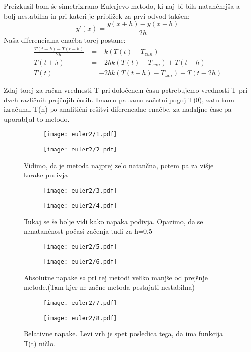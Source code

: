 \documentclass{article}
\begin{document}
Preizkusil bom še simetrizirano Eulerjevo metodo, ki naj bi bila natančnejša a bolj nestabilna in pri kateri je približek za prvi odvod takšen:
\begin{equation*}
y'(x) = \frac{y(x+h) - y(x-h)}{2h}
\end{equation*}
Naša diferencialna enačba torej postane:
\begin{align*}
\frac{T(t+h)-T(t-h)}{2h} &= -k(T(t) - T_{zun}) \\
T(t+h) &= -2hk(T(t) - T_{zun}) + T(t-h) \\
T(t) &= -2hk(T(t-h) - T_{zun}) + T(t-2h)  
\end{align*}

Zdaj torej za račun vrednosti T pri določenem času potrebujemo vrednosti T pri dveh različnih prejšnjih časih. Imamo pa samo začetni pogoj T(0), zato bom izračunal T(h) po analitični rešitvi diferencalne enačbe, za nadaljne čase pa uporabljal to metodo.

\begin{figure}[H]
\begin{subfigure}{.5\textwidth}
\texttt{[image: euler2/1.pdf]}
\end{subfigure}
\begin{subfigure}{.5\textwidth}
\texttt{[image: euler2/2.pdf]}
\end{subfigure}
\caption*{Vidimo, da je metoda najprej zelo natančna, potem pa za višje korake podivja}
\end{figure}
\begin{figure}[H]
\begin{subfigure}{.5\textwidth}
\texttt{[image: euler2/3.pdf]}
\end{subfigure}
\begin{subfigure}{.5\textwidth}
\texttt{[image: euler2/4.pdf]}
\end{subfigure}
\caption*{Tukaj se še bolje vidi kako napaka podivja. Opazimo, da se nenatančnost počasi začenja tudi za h=0.5}
\end{figure}
\begin{figure}[H]
\begin{subfigure}{.5\textwidth}
\texttt{[image: euler2/5.pdf]}
\end{subfigure}
\begin{subfigure}{.5\textwidth}
\texttt{[image: euler2/6.pdf]}
\end{subfigure}
\caption*{Absolutne napake so pri tej metodi veliko manjše od prejšnje metode.(Tam kjer ne začne metoda postajati nestabilna)}
\end{figure}
\begin{figure}[H]
\begin{subfigure}{.5\textwidth}
\texttt{[image: euler2/7.pdf]}
\end{subfigure}
\begin{subfigure}{.5\textwidth}
\texttt{[image: euler2/8.pdf]}
\end{subfigure}
\caption*{Relativne napake. Levi vrh je spet posledica tega, da ima funkcija T(t) ničlo.}
\end{figure}
\newpage
\end{document}

